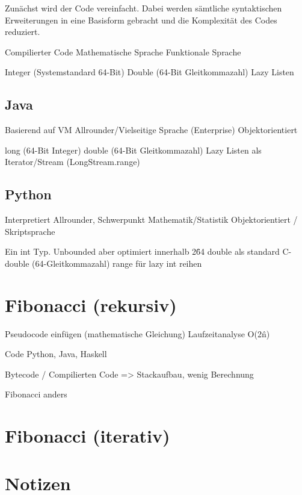 \documentclass[11pt, parskip=half]{scrartcl}       %
\begin{document}
Zunächst wird der Code vereinfacht. Dabei werden sämtliche syntaktischen Erweiterungen in eine Basisform gebracht und die Komplexität des Codes reduziert.
%

Compilierter Code
Mathematische Sprache
Funktionale Sprache

Integer (Systemstandard 64-Bit)
Double (64-Bit Gleitkommazahl)
Lazy Listen


\subsection{Java}
Basierend auf VM
Allrounder/Vielseitige Sprache (Enterprise)
Objektorientiert

long (64-Bit Integer)
double (64-Bit Gleitkommazahl)
Lazy Listen als Iterator/Stream (LongStream.range)


\subsection{Python}
Interpretiert
Allrounder, Schwerpunkt Mathematik/Statistik
Objektorientiert / Skriptsprache

Ein int Typ. Unbounded aber optimiert innerhalb 2\^64
double als standard C-double (64-Gleitkommazahl)
range für lazy int reihen


\section{Fibonacci (rekursiv)}
Pseudocode einfügen (mathematische Gleichung)
Laufzeitanalyse O(2\^n)

Code Python, Java, Haskell


Bytecode / Compilierten Code
=> Stackaufbau, wenig Berechnung

Fibonacci anders

\section{Fibonacci (iterativ)}



\section{Notizen}
\end{document}
